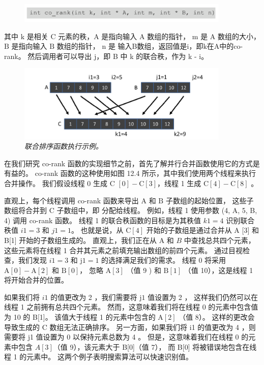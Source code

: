 \begin{figure}[H]
	\centering
	\includegraphics[width=0.9\textwidth]{figs/F12-a1.png}
\end{figure}

其中 $\mathrm{k}$ 是相关 $\mathrm{C}$ 元素的秩，$\mathrm{A}$ 是指向输入 $\mathrm{A}$ 数组的指针，
$\mathrm{ m}$ 是 $\mathrm{A}$ 数组的大小，$\mathrm{B}$ 是指向输入 $\mathrm{B}$ 数组的指针，
$\mathrm{n}$ 是 输入B数组，返回值是$\mathrm{i}$，即$\mathrm{k}$在A中的co-rank。
然后调用者可以导出 j，即 B 中 k 的联合秩，作为 k - i。

\begin{figure}[H]
	\centering
	\includegraphics[width=0.9\textwidth]{figs/F12.4.png}
	\caption{\textit{联合排序函数执行示例。}}
\end{figure}

在我们研究 co-rank 函数的实现细节之前，首先了解并行合并函数使用它的方式是有益的。 
co-rank 函数的这种使用如图 12.4 所示，其中我们使用两个线程来执行合并操作。 
我们假设线程 0 生成 $\mathrm{C}$ $[0]-\mathrm{C}[3]$，线程 1 生成 $\mathrm{C}[4]-\mathrm{C}[8]$ 。

直观上，每个线程调用 co-rank 函数来导出 $\mathrm{A}$ 和 $\mathrm{B}$ 子数组的起始位置，
这些子数组将合并到 $\mathrm{C}$ 子数组中，即 分配给线程。 例如，线程 1 使用参数 (4, A, 5, B, 4) 调用 co-rank 函数。 
线程 1 的联合秩函数的目标是为其秩值 $k 1=4$ 识别联合秩值 $i 1=3$ 和 $j 1=1$。 
也就是说，从 $\mathrm{C}[4]$ 开始的子数组是通过合并从 $\mathrm{A}$ [3] 和 B[1] 开始的子数组生成的。 
直观上，我们正在从 A 和 $B$ 中查找总共四个元素，这些元素将在线程 1 合并其元素之前填充输出数组的前四个元素。 
通过目视检查，我们发现 $i 1=3$ 和 $\mathrm{j} 1=1$ 的选择满足我们的需求。 
线程 0 将采用 $\mathrm{A}[0]-\mathrm{A}[2]$ 和 $\mathrm{B}[0]$，
忽略 $\mathrm{A}[3]$ （值 9 ) 和 $\mathrm{B}[1]$ （值 10），这是线程 1 将开始合并的位置。

如果我们将 $i 1$ 的值更改为 2 ，我们需要将 $\mathrm{j} 1$ 值设置为 2 ，
这样我们仍然可以在线程 1 之前拥有总共四个元素。 然而，这意味着我们将在线程 0 的元素中包含值为 10 的 B[1]。 
该值大于线程 1 的元素中包含的 $\mathrm{A}[2]$ （值 8）。 这样的更改会导致生成的 $\mathrm{C}$ 数组无法正确排序。 
另一方面，如果我们将 i1 的值更改为 4 ，则需要将 j1 值设置为 0 以保持元素总数为 4 。 
但是，这意味着我们在线程 0 的元素中包含 $A[3]$（值 9），该元素大于 B[0]（值 7），
而 B[0] 将被错误地包含在线程 1 的元素中。 这两个例子表明搜索算法可以快速识别值。

